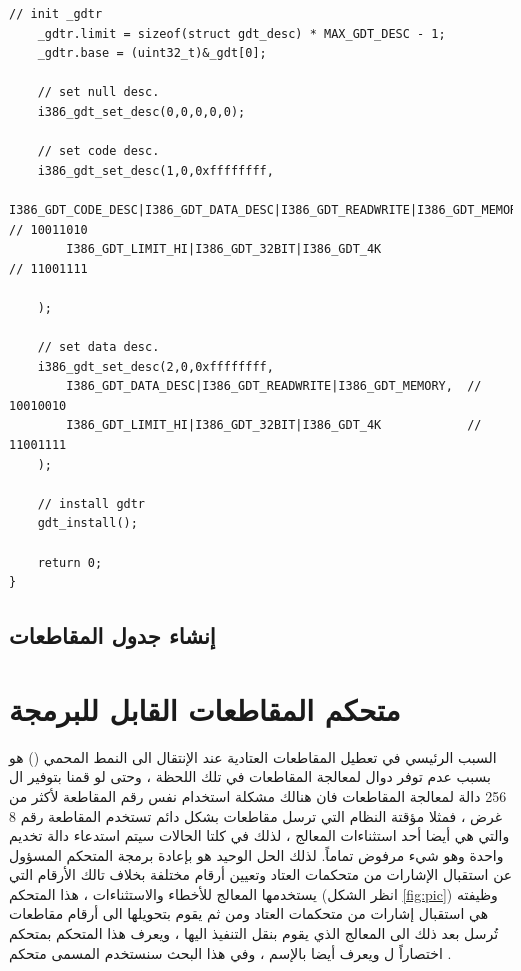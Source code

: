 \documentclass[document.tex]{subfiles}
\begin{document}
\begin{english}
\begin{lstlisting}[label=gdt_c,caption=\en{hal/gdt.cpp:Install GDT}]
	// init _gdtr
	_gdtr.limit = sizeof(struct gdt_desc) * MAX_GDT_DESC - 1;
	_gdtr.base = (uint32_t)&_gdt[0];
	
	// set null desc.
	i386_gdt_set_desc(0,0,0,0,0);
	
	// set code desc.
	i386_gdt_set_desc(1,0,0xffffffff,
		I386_GDT_CODE_DESC|I386_GDT_DATA_DESC|I386_GDT_READWRITE|I386_GDT_MEMORY, 	// 10011010
		I386_GDT_LIMIT_HI|I386_GDT_32BIT|I386_GDT_4K 								// 11001111
 
	);
	
	// set data desc.
	i386_gdt_set_desc(2,0,0xffffffff,
		I386_GDT_DATA_DESC|I386_GDT_READWRITE|I386_GDT_MEMORY, 	// 10010010
		I386_GDT_LIMIT_HI|I386_GDT_32BIT|I386_GDT_4K			// 11001111
	);
	
	// install gdtr
	gdt_install();
	
	return 0;
}

\end{lstlisting}
\end{english}

\subsection{إنشاء جدول المقاطعات }

\section{متحكم المقاطعات القابل للبرمجة }
السبب الرئيسي في تعطيل المقاطعات العتادية عند الإنتقال الى النمط المحمي () هو بسبب عدم توفر دوال لمعالجة المقاطعات في تلك اللحظة ، وحتى لو قمنا بتوفير ال 256 دالة لمعالجة المقاطعات فان هنالك مشكلة استخدام نفس رقم المقاطعة لأكثر من غرض ، فمثلا مؤقتة النظام  التي ترسل مقاطعات بشكل دائم تستخدم المقاطعة رقم 8 والتي هي أيضا أحد استثناءات المعالج ، لذلك في كلتا الحالات سيتم استدعاء دالة تخديم واحدة وهو شيء مرفوض تماماً. لذلك الحل الوحيد هو بإعادة برمجة المتحكم المسؤول عن استقبال الإشارات من متحكمات العتاد  وتعيين أرقام مختلفة بخلاف تالك الأرقام التي يستخدمها المعالج للأخطاء والاستثناءات ، هذا المتحكم (انظر الشكل \ref{fig:pic}) وظيفته هي استقبال إشارات من متحكمات العتاد ومن ثم يقوم بتحويلها الى أرقام مقاطعات تُرسل بعد ذلك الى المعالج الذي يقوم بنقل التنفيذ اليها ، ويعرف هذا المتحكم بمتحكم  اختصاراً ل  ويعرف أيضا بالإسم  ، وفي هذا البحث سنستخدم المسمى متحكم .
\end{document}
